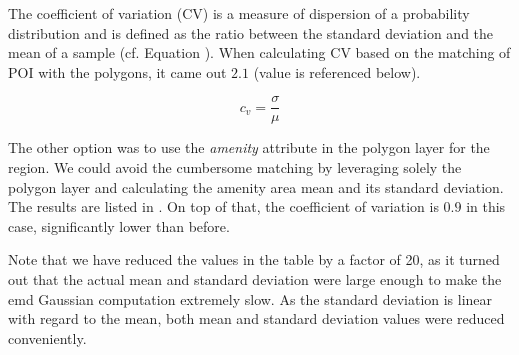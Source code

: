 The coefficient of variation (CV) is a measure of dispersion of a probability distribution and is defined as the ratio between the standard deviation and the mean of a sample (cf. Equation ). When calculating CV based on the matching of POI with the polygons, it came out $2.1$ (value is referenced below).

\begin{equation}
c_v = \frac{\sigma}{\mu} 
\label{eq:cv}
\end{equation}

The other option was to use the \textit{amenity} attribute in the polygon layer for the region. We could avoid the cumbersome matching by leveraging solely the polygon layer and calculating the amenity area mean and its standard deviation. The results are listed in . On top of that, the coefficient of variation is $0.9$ in this case, significantly lower than before. 

Note that we have reduced the values in the table by a factor of 20, as it turned out that the actual mean and standard deviation were large enough to make the emd Gaussian computation extremely slow. As the standard deviation is linear with regard to the mean, both mean and standard deviation values were reduced conveniently. 

